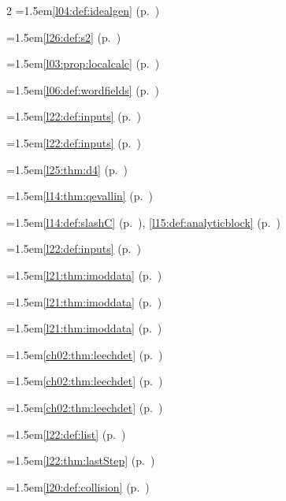 \begin{multicols}{2}
\hangindent=1.5em\quad \ref{l04:def:idealgen} (p.~\pageref{l04:def:idealgen})\par
\hangindent=1.5em\quad \ref{l26:def:s2} (p.~\pageref{l26:def:s2})\par
\hangindent=1.5em\quad \ref{l03:prop:localcalc} (p.~\pageref{l03:prop:localcalc})\par
\hangindent=1.5em\quad \ref{l06:def:wordfields} (p.~\pageref{l06:def:wordfields})\par
\hangindent=1.5em\quad \ref{l22:def:inputs} (p.~\pageref{l22:def:inputs})\par
\hangindent=1.5em\quad \ref{l22:def:inputs} (p.~\pageref{l22:def:inputs})\par
\hangindent=1.5em\quad \ref{l25:thm:d4} (p.~\pageref{l25:thm:d4})\par
\hangindent=1.5em\quad \ref{l14:thm:qevallin} (p.~\pageref{l14:thm:qevallin})\par
\hangindent=1.5em\quad \ref{l14:def:slashC} (p.~\pageref{l14:def:slashC}), \ref{l15:def:analyticblock} (p.~\pageref{l15:def:analyticblock})\par
\hangindent=1.5em\quad \ref{l22:def:inputs} (p.~\pageref{l22:def:inputs})\par
\hangindent=1.5em\quad \ref{l21:thm:imoddata} (p.~\pageref{l21:thm:imoddata})\par
\hangindent=1.5em\quad \ref{l21:thm:imoddata} (p.~\pageref{l21:thm:imoddata})\par
\hangindent=1.5em\quad \ref{l21:thm:imoddata} (p.~\pageref{l21:thm:imoddata})\par
\hangindent=1.5em\quad \ref{ch02:thm:leechdet} (p.~\pageref{ch02:thm:leechdet})\par
\hangindent=1.5em\quad \ref{ch02:thm:leechdet} (p.~\pageref{ch02:thm:leechdet})\par
\hangindent=1.5em\quad \ref{ch02:thm:leechdet} (p.~\pageref{ch02:thm:leechdet})\par
\hangindent=1.5em\quad \ref{l22:def:list} (p.~\pageref{l22:def:list})\par
\hangindent=1.5em\quad \ref{l22:thm:lastStep} (p.~\pageref{l22:thm:lastStep})\par
\hangindent=1.5em\quad \ref{l20:def:collision} (p.~\pageref{l20:def:collision})\par

\end{multicols}
